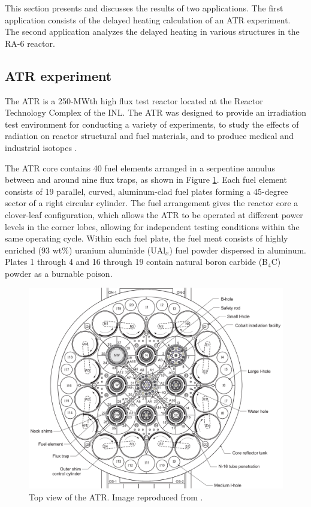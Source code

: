 \documentclass{style/nseJournal}
\begin{document}
This section presents and discusses the results of two applications.
The first application consists of the delayed heating calculation of an ATR experiment.
The second application analyzes the delayed heating in various structures in the RA-6 reactor.


\subsection{ATR experiment}

The \gls*{ATR} is a 250-MWth high flux test reactor located at the Reactor Technology Complex of the \gls*{INL}.
The ATR was designed to provide an irradiation test environment for conducting a variety of experiments, to study the effects of radiation on reactor structural and fuel materials, and to produce medical and industrial isotopes \cite{ICSBEP, tomberlin_advanced_2002}.

The ATR core contains 40 fuel elements arranged in a serpentine annulus between and around nine flux traps, as shown in Figure \ref{fig:atr}.
Each fuel element consists of 19 parallel, curved, aluminum-clad fuel plates forming a 45-degree sector of a right circular cylinder.
The fuel arrangement gives the reactor core a clover-leaf configuration, which allows the \gls*{ATR} to be operated at different power levels in the corner lobes, allowing for independent testing conditions within the same operating cycle.
Within each fuel plate, the fuel meat consists of highly enriched (93 wt\%) uranium aluminide (UAl$_x$) fuel powder dispersed in aluminum.
Plates 1 through 4 and 16 through 19 contain natural boron carbide (B$_4$C) powder as a burnable poison.

\begin{figure}[htbp!] %
    \centering
    \includegraphics[width=0.90\linewidth]{figures/atr2}
    \hfill
    \caption{Top view of the ATR. Image reproduced from \cite{ICSBEP}.}
    \label{fig:atr}
\end{figure}
\end{document}
